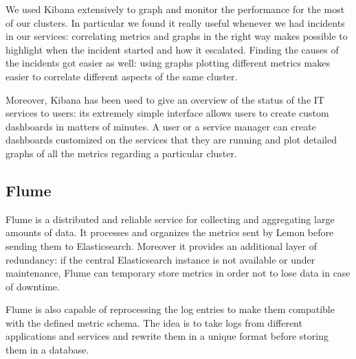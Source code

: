 We used Kibana extensively to graph and monitor the performance for the
most of our clusters. In particular we found it really useful whenever we
had incidents in our services: correlating metrics and graphs in the right
way makes possible to highlight when the incident started and how it
escalated. Finding the causes of the incidents got easier as well: using
graphs plotting different metrics makes easier to correlate different
aspects of the same cluster.

Moreover, Kibana has been used to give an overview of the status of the IT
services to users: its extremely simple interface allows users to create
custom dashboards in matters of minutes. A user or a service manager can
create dashboards customized on the services that they are running and
plot detailed graphs of all the metrics regarding a particular cluster.

\subsection{Flume}

Flume \cite{FlumeWebsite} is a distributed and reliable service for
collecting and aggregating large amounts of data. It processes and
organizes the metrics sent by Lemon before sending them to Elasticsearch.
Moreover it provides an additional layer of redundancy: if the central
Elasticsearch instance is not available or under maintenance, Flume can
temporary store metrics in order not to lose data in case of downtime.

Flume is also capable of reprocessing the log entries to make them
compatible with the defined metric schema. The idea is to take logs from
different applications and services and rewrite them in a unique format
before storing them in a database.
